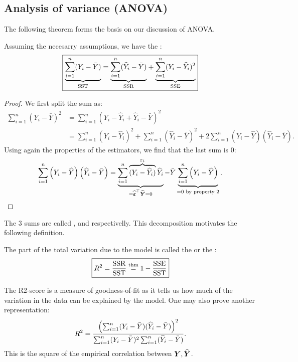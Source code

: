 \subsection{Analysis of variance (ANOVA)}
The following theorem forms the basis on our discussion of ANOVA. 
\begin{theorem} \label{thm:ANOVA}
    Assuming the necesarry assumptions, we have the :
    $$
    \boxed{
    \underset{\mathrm{SST}}{\underbrace{
        \sum_{i=1}^n (Y_i - \bar{Y})}} = 
    \underset{\mathrm{SSR}}{\underbrace{
        \sum_{i=1}^n (\widehat{Y}_i - \bar{Y})}} + 
    \underset{\mathrm{SSE}}{\underbrace{
        \sum_{i=1}^n (Y_i - \widehat{Y}_i)^2}}
    }
    $$
\end{theorem}
\begin{proof}
    We first split the sum as:
    \begin{align*}
        \sum_{i=1}^{n}\left(Y_{i}-\bar{Y}\right)^{2}
        &=\sum_{i=1}^{n}\left(Y_{i}-\hat{Y}_{i}+\hat{Y}_{i}-\bar{Y}\right)^{2}
        \\&= \sum_{i=1}^{n}\left(Y_{i}-\hat{Y}_{i}\right)^{2}+\sum_{i=1}^{n}\left(\hat{Y}_{i}-\bar{Y}\right)^2 
        +2{\sum_{i=1}^{n}\left(Y_{i}-\hat{Y}\right)\left(\hat{Y}_{i}-\bar{Y}\right)}.
    \end{align*}
    Using again the properties of the estimators, we find that the last sum is $0$:
    $$
        \sum_{i=1}^{n}\left(Y_{i}-\widehat{Y}\right)\left(\widehat{Y}_{i}-\bar{Y}\right)
        =
        \underbrace{\sum_{i=1}^{n} \overbrace{(Y_i-\widehat{Y}_i)}^{\varepsilon_i}\widehat{Y}_{i}}_{=\widehat{\boldsymbol{\varepsilon}}^\top\widehat{\boldsymbol{Y}}=0}
        -\bar{Y}\underbrace{\sum_{i=1}^{n}\left(Y_{i}-\widehat{Y}\right)}_{=0 \textrm{ by property 2}}.
    $$
\end{proof}
The 3 sums are called ,  and  respectivelly. 
This decomposition motivates the following definition. 
\begin{definition}
    The part of the total variation due to the model is called the  or the :
    \begin{equation}
        \boxed{
            R^2 = \frac{\mathrm{SSR}}{\mathrm{SST}} \overset{\mathrm{thm}} = 1 - \frac{\mathrm{SSE}}{\mathrm{SST}}}        
    \end{equation}
\end{definition}
The R2-score is a measure of goodness-of-fit as it tells us how much of the variation in the data can be explained by the model. One may also prove another representation:
$$
    R^2 = \frac{\left( \sum_{i=1}^n(Y_i-\bar{Y})(\widehat{Y}_i-\bar{Y}) \right)^2}{\sum_{i=1}^n(Y_i-\bar{Y})^2\sum_{i=1}^n(\widehat{Y}_i-\bar{Y})}.
$$
This is the square of the empirical correlation between $\boldsymbol{Y}, \widehat{\boldsymbol{Y}}$.

